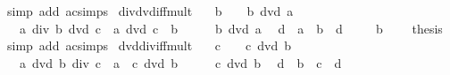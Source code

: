 \begin{isabellebody}
\ {\isacharparenleft}{\kern0pt}simp\ add{\isacharcolon}{\kern0pt}\ ac{\isacharunderscore}{\kern0pt}simps{\isacharparenright}{\kern0pt}%
\endisatagproof
{\isafoldproof}%
%
\isadelimproof
\isanewline
%
\endisadelimproof
\isanewline
{}\isamarkupfalse%
\ div{\isacharunderscore}{\kern0pt}dvd{\isacharunderscore}{\kern0pt}iff{\isacharunderscore}{\kern0pt}mult{\isacharcolon}{\kern0pt}\isanewline
\ \ \ {\isachardoublequoteopen}b\ {\isasymnoteq}\ {}{\isachardoublequoteclose}\ \ {\isachardoublequoteopen}b\ dvd\ a{\isachardoublequoteclose}\isanewline
\ \ \ {\isachardoublequoteopen}a\ div\ b\ dvd\ c\ {\isasymlongleftrightarrow}\ a\ dvd\ c\ {\isacharasterisk}{\kern0pt}\ b{\isachardoublequoteclose}\isanewline
%
\isadelimproof
%
\endisadelimproof
%
\isatagproof
{}\isamarkupfalse%
\ {\isacharminus}{\kern0pt}\isanewline
\ \ \isamarkupfalse%
\ {\isacartoucheopen}b\ dvd\ a{\isacartoucheclose}\ \isamarkupfalse%
\ d\ \ {\isachardoublequoteopen}a\ {\isacharequal}{\kern0pt}\ b\ {\isacharasterisk}{\kern0pt}\ d{\isachardoublequoteclose}\ \isacommand{{\isachardot}{\kern0pt}{\isachardot}{\kern0pt}}\isamarkupfalse%
\isanewline
\ \ \isamarkupfalse%
\ {\isacartoucheopen}b\ {\isasymnoteq}\ {}{\isacartoucheclose}\ \isamarkupfalse%
\ {\isacharquery}{\kern0pt}thesis\ \isamarkupfalse%
\ {\isacharparenleft}{\kern0pt}simp\ add{\isacharcolon}{\kern0pt}\ ac{\isacharunderscore}{\kern0pt}simps{\isacharparenright}{\kern0pt}\isanewline
{}\isamarkupfalse%
%
\endisatagproof
{\isafoldproof}%
%
\isadelimproof
\isanewline
%
\endisadelimproof
\isanewline
{}\isamarkupfalse%
\ dvd{\isacharunderscore}{\kern0pt}div{\isacharunderscore}{\kern0pt}iff{\isacharunderscore}{\kern0pt}mult{\isacharcolon}{\kern0pt}\isanewline
\ \ \ {\isachardoublequoteopen}c\ {\isasymnoteq}\ {}{\isachardoublequoteclose}\ \ {\isachardoublequoteopen}c\ dvd\ b{\isachardoublequoteclose}\isanewline
\ \ \ {\isachardoublequoteopen}a\ dvd\ b\ div\ c\ {\isasymlongleftrightarrow}\ a\ {\isacharasterisk}{\kern0pt}\ c\ dvd\ b{\isachardoublequoteclose}\isanewline
%
\isadelimproof
%
\endisadelimproof
%
\isatagproof
{}\isamarkupfalse%
\ {\isacharminus}{\kern0pt}\isanewline
\ \ \isamarkupfalse%
\ {\isacartoucheopen}c\ dvd\ b{\isacartoucheclose}\ \isamarkupfalse%
\ d\ \ {\isachardoublequoteopen}b\ {\isacharequal}{\kern0pt}\ c\ {\isacharasterisk}{\kern0pt}\ d{\isachardoublequoteclose}\ \isacommand{{\isachardot}{\kern0pt}{\isachardot}{\kern0pt}}\isamarkupfalse%

\end{isabellebody}
